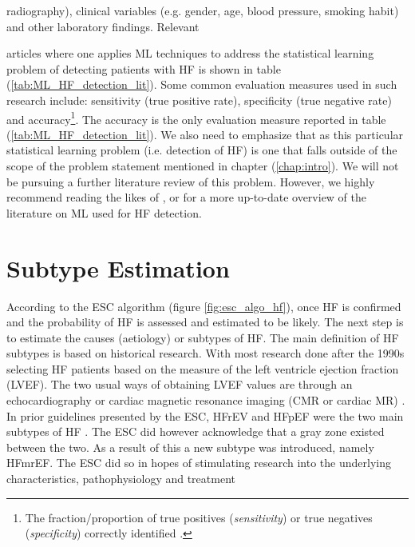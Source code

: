 \documentclass[../thesis.tex]{subfiles}
\begin{document}
radiography), clinical variables (e.g. gender, age, blood pressure, smoking habit) and other laboratory findings. Relevant



\noindent articles where one applies ML techniques to address the statistical learning problem of detecting patients with HF is shown in table (\ref{tab:ML_HF_detection_lit}). Some common evaluation measures used in such research include: sensitivity (true positive rate), specificity (true negative rate) and accuracy\footnote{The fraction/proportion of true positives (\textit{sensitivity}) or true negatives (\textit{specificity}) correctly identified \citep{james2013introduction}.}. The accuracy is the only evaluation measure reported in table (\ref{tab:ML_HF_detection_lit}). We also need to emphasize that as this particular statistical learning problem (i.e. detection of HF) is one that falls outside of the scope of the problem statement mentioned in chapter (\ref{chap:intro}). We will not be pursuing a further literature review of this problem. However, we highly recommend reading the likes of \cite{tripoliti2017heart}, \cite{acharya2017application} or \cite{awan2018machine} for a more up-to-date overview of the literature on ML used for HF detection. 


\section{Subtype Estimation}
\label{sec:subtypeest}

\noindent According to the ESC algorithm (figure \ref{fig:esc_algo_hf}), once HF is confirmed and the probability of HF is assessed and estimated to be likely. The next step is to estimate the causes (aetiology) or subtypes of HF. The main definition of HF subtypes is based on historical research. With most research done after the 1990s selecting HF patients based on the measure of the left ventricle ejection fraction (LVEF). The two usual ways of obtaining LVEF values are through an echocardiography or cardiac magnetic resonance imaging (CMR or cardiac MR) \citep{ponikowski2016}. In prior guidelines presented by the ESC, HFrEV and HFpEF were the two main subtypes of HF \citep{authors2012esc}. The ESC did however acknowledge that a gray zone existed between the two. As a result of this a new subtype was introduced, namely HFmrEF. The ESC did so in hopes of stimulating research into the underlying characteristics, pathophysiology and treatment  
\end{document}
